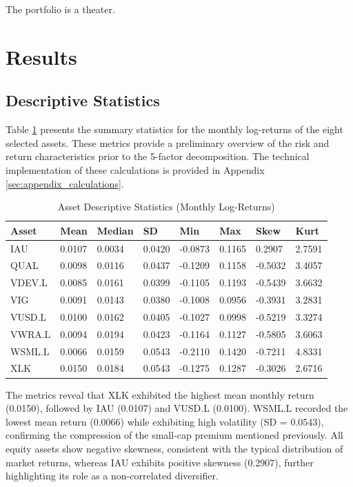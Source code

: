 \documentclass[12pt]{article}
\begin{document}
The portfolio is a theater.
\section{Results}

\subsection{Descriptive Statistics}
Table \ref{tab:descriptive_stats} presents the summary statistics for the monthly log-returns of the eight selected assets. These metrics provide a preliminary overview of the risk and return characteristics prior to the 5-factor decomposition. The technical implementation of these calculations is provided in Appendix \ref{sec:appendix_calculations}.

\begin{table}[htbp]
    \centering
    \caption{Asset Descriptive Statistics (Monthly Log-Returns)}
    \label{tab:descriptive_stats}
    \begin{tabularx}{\textwidth}{lXXXXXXX}
        \toprule
        \textbf{Asset} & \textbf{Mean} & \textbf{Median} & \textbf{SD} & \textbf{Min} & \textbf{Max} & \textbf{Skew} & \textbf{Kurt} \\ 
        \midrule
        IAU    & 0.0107 & 0.0034 & 0.0420 & -0.0873 & 0.1165 & 0.2907 & 2.7591 \\ 
        QUAL   & 0.0098 & 0.0116 & 0.0437 & -0.1209 & 0.1158 & -0.5032 & 3.4057 \\ 
        VDEV.L & 0.0085 & 0.0161 & 0.0399 & -0.1105 & 0.1193 & -0.5439 & 3.6632 \\ 
        VIG    & 0.0091 & 0.0143 & 0.0380 & -0.1008 & 0.0956 & -0.3931 & 3.2831 \\ 
        VUSD.L & 0.0100 & 0.0162 & 0.0405 & -0.1027 & 0.0998 & -0.5219 & 3.3274 \\ 
        VWRA.L & 0.0094 & 0.0194 & 0.0423 & -0.1164 & 0.1127 & -0.5805 & 3.6063 \\ 
        WSML.L & 0.0066 & 0.0159 & 0.0543 & -0.2110 & 0.1420 & -0.7211 & 4.8331 \\ 
        XLK    & 0.0150 & 0.0184 & 0.0543 & -0.1275 & 0.1287 & -0.3026 & 2.6716 \\ 
        \bottomrule
    \end{tabularx}
\end{table}

The metrics reveal that XLK exhibited the highest mean monthly return (0.0150), followed by IAU (0.0107) and VUSD.L (0.0100). WSML.L recorded the lowest mean return (0.0066) while exhibiting high volatility (SD = 0.0543), confirming the compression of the small-cap premium mentioned previously. All equity assets show negative skewness, consistent with the typical distribution of market returns, whereas IAU exhibits positive skewness (0.2907), further highlighting its role as a non-correlated diversifier.
\end{document}
